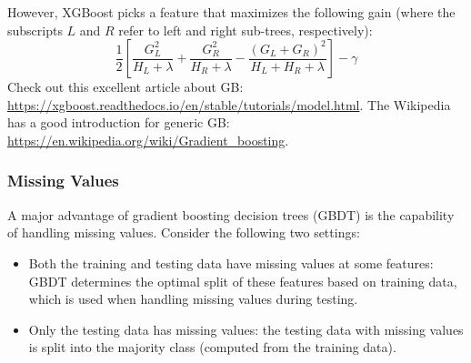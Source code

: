         However, XGBoost picks a feature that maximizes the following gain (where the subscripts $L$ and $R$ refer to left and right sub-trees, respectively):
            \begin{equation}
                \frac{1}{2}\left[ \frac{G_L^2}{H_L + \lambda} + \frac{G_R^2}{H_R + \lambda} - \frac{(G_L + G_R)^2}{H_L +  H_R + \lambda}  \right] - \gamma
            \end{equation}
        Check out this excellent article about GB: \url{https://xgboost.readthedocs.io/en/stable/tutorials/model.html}.
        The Wikipedia has a good introduction for generic GB: \url{https://en.wikipedia.org/wiki/Gradient_boosting}.
    
        
        
    \subsubsection{Missing Values}
        A major advantage of gradient boosting decision trees (GBDT) is the capability of handling missing values.
        Consider the following two settings:
            \begin{itemize}
                \item Both the training and testing data have missing values at some features: GBDT determines the optimal split of these features based on training data, which is used when handling missing values during testing.
                \item Only the testing data has missing values: the testing data with missing values is split into the majority class (computed from the training data).
            \end{itemize}

